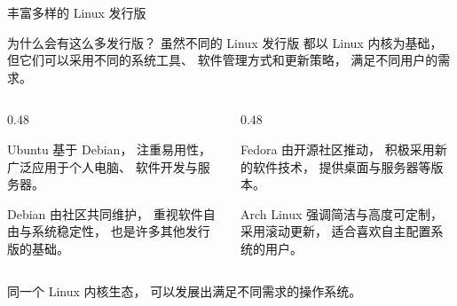 \documentclass[aspectratio=169]{beamer}
\begin{document}
\begin{frame}{丰富多样的 Linux 发行版}
	
	\begin{block}{为什么会有这么多发行版？}
		\hspace*{2em}虽然不同的 Linux 发行版
		都以 Linux 内核为基础，
		但它们可以采用不同的系统工具、
		软件管理方式和更新策略，
		满足不同用户的需求。
	\end{block}
	\begin{columns}[T,onlytextwidth]
		
		\begin{column}{0.48\textwidth}
			
			\begin{block}{Ubuntu}
				基于 Debian，
				注重易用性，
				广泛应用于个人电脑、
				软件开发与服务器。
			\end{block}
			
			\begin{block}{Debian}
				由社区共同维护，
				重视软件自由与系统稳定性，
				也是许多其他发行版的基础。
			\end{block}
			
		\end{column}
		
		\begin{column}{0.48\textwidth}
			
			\begin{block}{Fedora}
				由开源社区推动，
				积极采用新的软件技术，
				提供桌面与服务器等版本。
			\end{block}
			\begin{block}{Arch Linux}
				强调简洁与高度可定制，
				采用滚动更新，
				适合喜欢自主配置系统的用户。
			\end{block}
			
		\end{column}
		
	\end{columns}
	\begin{center}
		\alert{同一个 Linux 内核生态，
			可以发展出满足不同需求的操作系统。}
	\end{center}
	
\end{frame}
\end{document}
